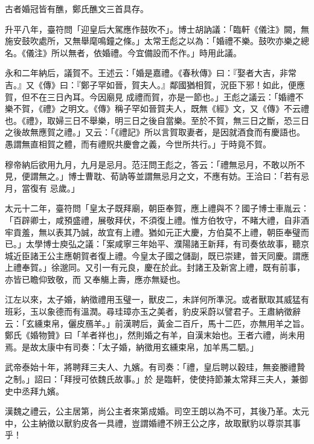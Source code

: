 \begin{pinyinscope}
 古者婚冠皆有醮，鄭氏醮文三首具存。



 升平八年，臺符問「迎皇后大駕應作鼓吹不」。博士胡訥議：「臨軒《儀注》闕，無施安鼓吹處所，又無舉麾鳴鐘之條。」太常王彪之以為：「婚禮不樂。鼓吹亦樂之總名。《儀注》所以無者，依婚禮。今宜備設而不作。」時用此議。



 永和二年納后，議賀不。王述云：「婚是嘉禮。《春秋傳》曰：『娶者大吉，非常吉。』又《傳》曰：『鄭子罕如晉，賀夫人。』鄰國猶相賀，況臣下邪！如此，便應賀，但不在三日內耳。今因廟見
 成禮而賀，亦是一節也。」王彪之議云：「婚禮不樂不賀，《禮》之明文。《傳》稱子罕如晉賀夫人，既無《經》文，又《傳》不云禮也。《禮》，取婦三日不舉樂，明三日之後自當樂。至於不賀，無三日之斷，恐三日之後故無應賀之禮。」又云：「《禮記》所以言賀取妻者，是因就酒食而有慶語也。愚謂無直相賀之體，而有禮貺共慶會之義，今世所共行。」于時竟不賀。



 穆帝納后欲用九月，九月是忌月。范汪問王彪之，答云：「禮無忌月，不敢以所不見，便謂無之。」博士曹耽、荀訥等並謂無忌月之文，不應有妨。王洽曰：「若有忌月，當復有
 忌歲。」



 太元十二年，臺符問「皇太子既拜廟，朝臣奉賀，應上禮與不？國子博士車胤云：「百辟卿士，咸預盛禮，展敬拜伏，不須復上禮。惟方伯牧守，不睹大禮，自非酒牢貢羞，無以表其乃誠，故宜有上禮。猶如元正大慶，方伯莫不上禮，朝臣奉璧而已。」太學博士庾弘之議：「案咸寧三年始平、濮陽諸王新拜，有司奏依故事，聽京城近臣諸王公主應朝賀者復上禮。今皇太子國之儲副，既已崇建，普天同慶。謂應上禮奉賀。」徐邈同。又引一有元良，慶在於此。封諸王及新宮上禮，既有前事，亦皆已瞻仰致敬，而
 又奉觴上壽，應亦無疑也。



 江左以來，太子婚，納徵禮用玉璧一，獸皮二，未詳何所準況。或者獸取其威猛有班彩，玉以象德而有溫潤。尋珪璋亦玉之美者，豹皮采蔚以譬君子。王肅納徵辭云：「玄纁束帛，儷皮鴈羊。」前漢聘后，黃金二百斤，馬十二匹，亦無用羊之旨。鄭氏《婚物贊》曰「羊者祥也」，然則婚之有羊，自漢末始也。王者六禮，尚未用焉。是故太康中有司奏：「太子婚，納徵用玄纁束帛，加羊馬二駟。」



 武帝泰始十年，將聘拜三夫人、九嬪。有司奏：「禮，皇后聘以穀珪，無妾媵禮贄之制。」詔曰：「拜授可依魏氏故事。」於
 是臨軒，使使持節兼太常拜三夫人，兼御史中丞拜九嬪。



 漢魏之禮云，公主居第，尚公主者來第成婚。司空王朗以為不可，其後乃革。太元中，公主納徵以獸豹皮各一具禮，豈謂婚禮不辨王公之序，故取獸豹以尊崇其事乎！




\end{pinyinscope}

